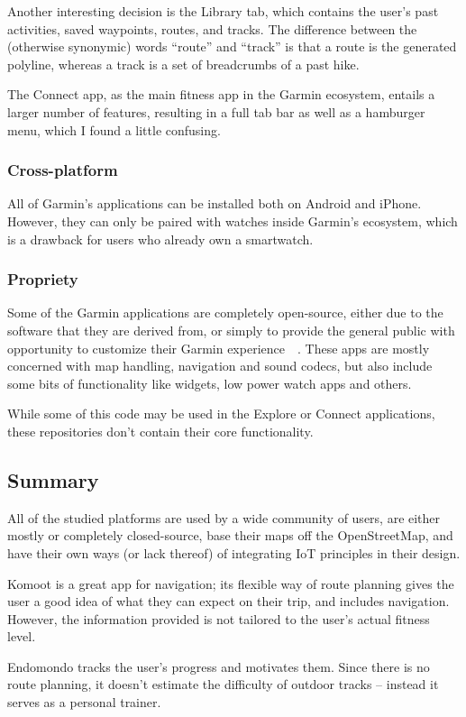 Another interesting decision is the Library tab, which contains the user's past activities, saved waypoints, routes, and tracks.
The difference between the (otherwise synonymic) words ``route'' and ``track'' is that a route is the generated polyline, whereas a track is a set of breadcrumbs of a past hike.

The Connect app, as the main fitness app in the Garmin ecosystem, entails a larger number of features, resulting in a full tab bar as well as a hamburger menu, which I found a little confusing.

\subsubsection*{Cross-platform}
All of Garmin's applications can be installed both on Android and iPhone.
However, they can only be paired with watches inside Garmin's ecosystem, which is a drawback for users who already own a smartwatch.
\subsubsection*{Propriety}
Some of the Garmin applications are completely open-source, either due to the software that they are derived from, or simply to provide the general public with opportunity to customize their Garmin experience~\cite{garmin-open-source}~\cite{garmin-connect-github-repos}.
These apps are mostly concerned with map handling, navigation and sound codecs, but also include some bits of functionality like widgets, low power watch apps and others.

While some of this code may be used in the Explore or Connect applications, these repositories don't contain their core functionality.

\subsection{Summary}
All of the studied platforms are used by a wide community of users, are either mostly or completely closed-source, base their maps off the OpenStreetMap, and have their own ways (or lack thereof) of integrating IoT principles in their design.

Komoot is a great app for navigation; its flexible way of route planning gives the user a good idea of what they can expect on their trip,
and includes navigation.
However, the information provided is not tailored to the user's actual fitness level.

Endomondo tracks the user's progress and motivates them.
Since there is no route planning, it doesn't estimate the difficulty of outdoor tracks -- instead it serves as a personal trainer.

